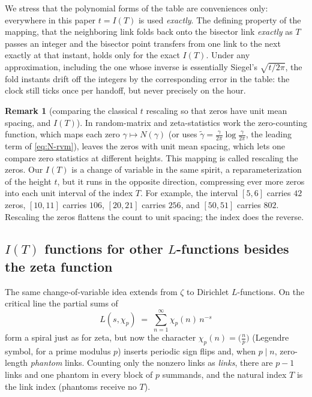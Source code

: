 \documentclass[11pt]{article}
\theoremstyle{definition}
\newtheorem{remark}[theorem]{Remark}
\begin{document}
We stress that the polynomial forms of the table are conveniences only:
everywhere in this paper $t=I(T)$ is used \emph{exactly}. The defining
property of the mapping, that the neighboring link folds back onto the
bisector link \emph{exactly} as $T$ passes an integer and the bisector
point transfers from one link to the next exactly at that instant,
holds only for the exact $I(T)$. Under any approximation, including the one whose
inverse is essentially Siegel's $\sqrt{t/2\pi}$, the fold instants drift
off the integers by the corresponding error in the table: the clock
still ticks once per handoff, but never precisely on the hour.

\begin{remark}[comparing the classical $t$ rescaling so that zeros have unit
mean spacing, and $I(T)$]\label{rem:unfolding}
In random-matrix and zeta-statistics work the zero-counting function, which
maps each zero $\gamma\mapsto N(\gamma)$ (or uses
$\tilde\gamma=\frac{\gamma}{2\pi}\log\frac{\gamma}{2\pi}$, the leading term of
\eqref{eq:N-rvm}), leaves the zeros with unit mean spacing, which lets
one compare zero statistics at different heights. This mapping is called
rescaling the zeros. Our $I(T)$ is a change of
variable in the same spirit, a reparameterization of the height $t$, but it
runs in the opposite direction, compressing ever more zeros into each unit
interval of the index $T$. For example, the interval $[5,6]$ carries $42$
zeros, $[10,11]$ carries $106$, $[20,21]$ carries $256$, and $[50,51]$ carries
$802$. Rescaling the zeros flattens the count to unit spacing; the index does
the reverse.
\end{remark}

\subsection{\texorpdfstring{$I(T)$}{I(T)} functions for other \texorpdfstring{$L$}{L}-functions besides the zeta function}\label{sec:IT-Lfunctions}

The same change-of-variable idea extends from $\zeta$ to Dirichlet
$L$-functions. On the critical line the partial sums of
\begin{equation}\label{eq:Lchi}
L(s,\chi_p)
\;=\;
\sum_{n=1}^{\infty}\chi_p(n)\,n^{-s}
\end{equation}
form a spiral just as for zeta, but now the character
$\chi_p(n)=\bigl(\tfrac{n}{p}\bigr)$ (Legendre symbol, for a prime modulus
$p$) inserts periodic sign flips and, when $p\mid n$, zero-length
\emph{phantom} links. Counting only the nonzero links as \emph{links},
there are $p-1$ links and one phantom in every block of $p$ summands, and
the natural index $T$ is the link index (phantoms receive no $T$).
\end{document}
